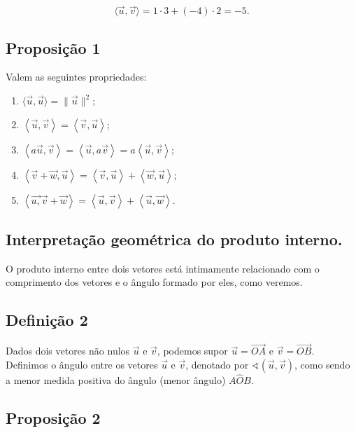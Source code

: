 \documentclass[
  brazilian,
  letterpaper,
  DIV=11,
  numbers=noendperiod]{scrreprt}
\providecommand{\tightlist}{%
  \setlength{\itemsep}{0pt}\setlength{\parskip}{0pt}}
\theoremstyle{definition}
\theoremstyle{plain}
\theoremstyle{definition}
\theoremstyle{remark}
\begin{document}
\[
\langle \vec{u} ,\vec{v}\rangle=1\cdot3+(-4)\cdot2=-5.
\]

\subsection{Proposição 1}\label{proposiuxe7uxe3o-1-1}

Valem as seguintes propriedades:

\begin{enumerate}
\def\labelenumi{\arabic{enumi}.}
\tightlist
\item
  \(\langle \vec{u}, \vec{u} \rangle = \|\vec{u}\|^2\);
\item
  \(\left\langle\vec{u},\vec{v}\right\rangle=\left\langle\vec{v},\vec{u}\right\rangle\);
\item
  \(\left\langle
  a\vec{u},\vec{v}\right\rangle=\left\langle\vec{u},a\vec{v}\right\rangle=a\left\langle\vec{u},\vec{v}\right\rangle\);
\item
  \(\left\langle\vec{v}+\vec{w},\vec{u}\right\rangle=\left\langle\vec{v},\vec{u}\right\rangle+\left\langle\vec{w},\vec{u}\right\rangle\);
\item
  \(\left\langle\vec{u,}\vec{v}+\vec{w}\right\rangle=\left\langle\vec{u},\vec{v}\right\rangle+\left\langle\vec{u},\vec{w}\right\rangle\).
\end{enumerate}

\subsection{\texorpdfstring{\textbf{Interpretação geométrica do produto
interno.}}{Interpretação geométrica do produto interno.}}\label{interpretauxe7uxe3o-geomuxe9trica-do-produto-interno.}

O produto interno entre dois vetores está intimamente relacionado com o
comprimento dos vetores e o ângulo formado por eles, como veremos.

\subsection{Definição 2}\label{definiuxe7uxe3o-2-1}

Dados dois vetores não nulos \(\vec{u}\) e \(\vec{v}\), podemos supor
\(\vec{u}=\vec{OA}\) e \(\vec{v}=\vec{OB}\). Definimos o ângulo entre os
vetores \(\vec{u}\) e \(\vec{v}\), denotado por
\(\sphericalangle(\vec{u},\vec{v})\), como sendo a menor medida positiva
do ângulo (menor ângulo) \(A\hat{O}B\).

\subsection{Proposição 2}\label{proposiuxe7uxe3o-2-1}
\end{document}

